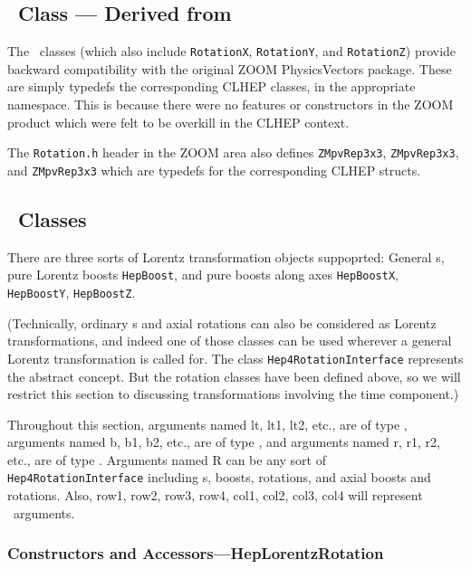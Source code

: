 \subsection{\protect\Ros\ Class --- Derived from \Ro }

The \Ros\ classes (which also include {\tt RotationX},
{\tt RotationY}, and {\tt RotationZ}) provide backward compatibility 
with the original ZOOM PhysicsVectors package.  
These are simply typedefs the corresponding CLHEP classes, 
in the appropriate namespace.
This is because there were no features or constructors in the ZOOM 
product which were felt to be overkill in the CLHEP context.  

The {\tt Rotation.h} header in the ZOOM area also defines
{\tt ZMpvRep3x3}, {\tt ZMpvRep3x3}, and {\tt ZMpvRep3x3} which 
are typedefs for the corresponding CLHEP structs.

\subsection{\protect\LT\ Classes}
\label{ltmethods}

There are three sorts of Lorentz transformation objects suppoprted:  
General \LT s, pure Lorentz boosts {\tt HepBoost}, and pure boosts 
along axes {\tt HepBoostX}, {\tt HepBoostY}, {\tt HepBoostZ}.   

(Technically, ordinary \Ro s and axial rotations can also be considered
as Lorentz transformations, and indeed one of those classes can be used
wherever a general Lorentz transformation is called for.  The class
{\tt Hep4RotationInterface} represents the abstract concept.
But the rotation classes have been defined above, so we will restrict this 
section to discussing transformations involving the time component.)

Throughout this section, 
arguments named lt, lt1, lt2, etc., are of type \LT,
arguments named b, b1, b2, etc., are of type \LB, and
arguments named r, r1, r2, etc., are of type \Ro .
Arguments named R can be any sort of {\tt Hep4RotationInterface} including
\LT s, boosts, rotations, and axial boosts and rotations.
Also, row1, row2, row3, row4, col1, col2, col3, col4
will represent \LV\ arguments.

\subsubsection{Constructors and Accessors---HepLorentzRotation}

